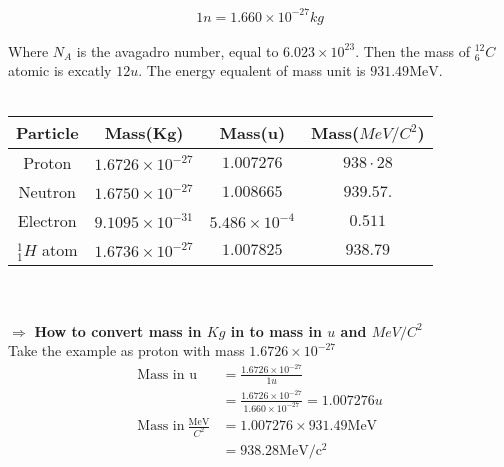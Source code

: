 \begin{enumerate}
\begin{center}
{{			\begin{align*}
			1 n=1.660 \times 10^{-27} kg
			\end{align*}} }
\end{center}
Where $N_A$ is the avagadro number, equal to $6.023 \times 10^{23}$. Then the mass of $^{12}_6C$ atomic is excatly $12 u$. The energy equalent of mass unit is $931.49 \mathrm{MeV} .$\\\\
\begin{tabular}{c|c|c|c|}
	\hline
	Particle & Mass(Kg) & Mass(u) & Mass($Me V/C^2$)\\
	\hline
	Proton & $1.6726 \times 10^{-27}$ & $1.007276$ & $938 \cdot 28$\\
	\hline
	Neutron & $1.6750 \times10^{-27}$ & $1.008665$ & $939.57 .$\\
	\hline
	Electron & $9.1095 \times 10^{-31}$ & $5.486 \times 10^{-4}$ & $0.511$\\
	\hline
	$^1_1 H$ atom & $1.6736 \times 10^{-27}$ & $1.007825$ & $938.79$\\
	\hline
\end{tabular}\\\\
$\Rightarrow$ \textbf{How to convert mass in $Kg$ in to mass in $u$ and $MeV/C^2$}\\
Take the example as proton with mass $1.6726 \times 10^{-27}$ 
\begin{align*}
\text{Mass in u}&=\frac{1.6726 \times 10^{-27}}{1u}\\
&=\frac{1.6726 \times 10^{-27}}{1.660 \times 10^{-27}}=1.007276u\\
\text{Mass in}\  \frac{\mathrm{MeV}}{C^2} &=1.007276 \times 931.49 \mathrm{MeV}\\
&=938.28 \mathrm{MeV} / \mathrm{c}^{2} 
\end{align*}
\end{enumerate}
